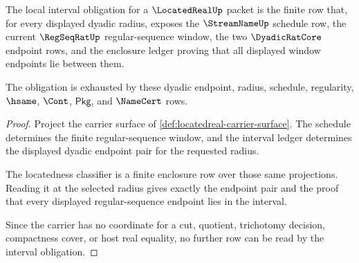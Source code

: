 \begin{theorem}
\label{thm:locatedreal-dyadic-interval-obligation}
The local interval obligation for a $\LocatedRealUp$ packet is the finite row that, for every displayed dyadic radius, exposes the $\StreamNameUp$ schedule row, the current $\RegSeqRatUp$ regular-sequence window, the two $\DyadicRatCore$ endpoint rows, and the enclosure ledger proving that all displayed window endpoints lie between them.

The obligation is exhausted by these dyadic endpoint, radius, schedule, regularity, $\hsame$, $\Cont$, $\mathsf{Pkg}$, and $\NameCert$ rows.
\end{theorem}
\begin{proof}
Project the carrier surface of \autoref{def:locatedreal-carrier-surface}. The schedule determines the finite regular-sequence window, and the interval ledger determines the displayed dyadic endpoint pair for the requested radius.

The locatedness classifier is a finite enclosure row over those same projections. Reading it at the selected radius gives exactly the endpoint pair and the proof that every displayed regular-sequence endpoint lies in the interval.

Since the carrier has no coordinate for a cut, quotient, trichotomy decision, compactness cover, or host real equality, no further row can be read by the interval obligation.
\end{proof}

